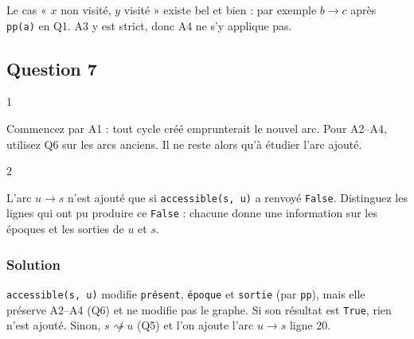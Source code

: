 \documentclass[11pt,a4paper]{article}
\begin{document}
\begin{piege}

Le cas « \(x\) non visité, \(y\) visité » existe bel et bien : par exemple \(b\to c\) après \texttt{pp(\textquotesingle{}a\textquotesingle{})} en Q1. A3 y est strict, donc A4 ne s'y applique pas.

\end{piege}

\hypertarget{question-7}{%
\subsection{Question 7}\label{question-7}}

\begin{indication}{1}

Commencez par A1 : tout cycle créé emprunterait le nouvel arc. Pour A2--A4, utilisez Q6 sur les arcs anciens. Il ne reste alors qu'à étudier l'arc ajouté.

\end{indication}

\begin{indication}{2}

L'arc \(u\to s\) n'est ajouté que si \texttt{accessible(s,\ u)} a renvoyé \texttt{False}. Distinguez les lignes qui ont pu produire ce \texttt{False} : chacune donne une information sur les époques et les sorties de \(u\) et \(s\).

\end{indication}

\hypertarget{solution-6}{%
\subsubsection{Solution}\label{solution-6}}

\texttt{accessible(s,\ u)} modifie \texttt{présent}, \texttt{époque} et \texttt{sortie} (par \texttt{pp}), mais elle préserve A2--A4 (Q6) et ne modifie pas le graphe. Si son résultat est \texttt{True}, rien n'est ajouté. Sinon, \(s\not\rightsquigarrow u\) (Q5) et l'on ajoute l'arc \(u\to s\) ligne 20.
\end{document}
